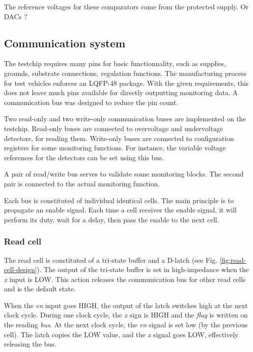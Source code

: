 The reference voltages for these comparators come from the protected supply.
Or DACs ?


\subsection{Communication system}

The testchip requires many pins for basic functionnality, such as supplies, grounds, substrate connections, regulation functions.
The manufacturing process for test vehicles enforces an LQFP-48 package.
With the given requirements, this does not leave much pins available for directly outputting monitoring data.
A communication bus was designed to reduce the pin count.

Two read-only and two write-only communication buses are implemented on the testchip.
Read-only buses are connected to overvoltage and undervoltage detectors, for reading them.
Write-only buses are connected to configuration registers for some monitoring functions.
For instance, the variable voltage references for the detectors can be set using this bus.

A pair of read/write bus serves to validate some monitoring blocks.
The second pair is connected to the actual monitoring function.

Each bus is constituted of individual identical cells.
The main principle is to propagate an enable signal.
Each time a cell receives the enable signal, it will perform its duty, wait for a delay, then pass the enable to the next cell.


\subsubsection{Read cell}

The read cell is constituted of a tri-state buffer and a D-latch (see Fig. \ref{fig:read-cell-design}).
The output of the tri-state buffer is set in high-impedance when the \textit{x} input is LOW.
This action releases the communication bus for other read cells and is the default state.

When the \textit{en} input goes HIGH, the output of the latch switches high at the next clock cycle.
During one clock cycle, the \textit{x} sign is HIGH and the \textit{flag} is written on the reading \textit{bus}.
At the next clock cycle, the \textit{en} signal is set low (by the previous cell).
The latch copies the LOW value, and the \textit{x} signal goes LOW, effectively releasing the bus.

